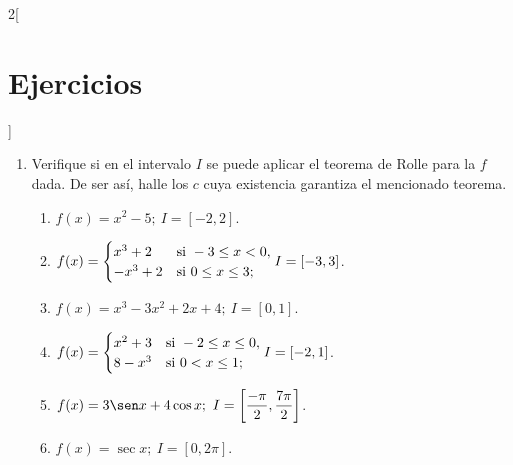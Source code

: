 \begin{multicols}{2}[\section{Ejercicios}]
\begingroup
\small
\begin{enumerate}[leftmargin=*]
\item Verifique si en el intervalo $I$ se puede aplicar el teorema de Rolle para la $f$ dada.
    De ser así, halle los $c$ cuya existencia garantiza el mencionado teorema.
    \begin{enumerate}[leftmargin=*]
    \item $\displaystyle f(x) = x^2 - 5;\ I = [-2,2]$.
    \item $\displaystyle f(x) =
          \begin{cases}
            x^3 + 2 & \text{si } -3 \leq x < 0, \\
            -x^3 + 2 & \text{si } 0 \leq x \leq 3;
          \end{cases}\\[6pt]
          I = [-3,3]$.
    \item $\displaystyle f(x) = x^3 - 3x^2 + 2x + 4;\ I = [0,1]$.
    \item $\displaystyle f(x) =
          \begin{cases}
            x^2 + 3 & \text{si } -2 \leq x \leq 0, \\
            8 - x^3 & \text{si } 0 < x \leq 1;
          \end{cases}\\[6pt]
          I = [-2,1]$.
    \item $\displaystyle f(x) = 3\sen x + 4\cos x;\ I =
        \left[\frac{-\pi}{2},\frac{7\pi}{2}\right]$.
    \item $\displaystyle f(x) = \sec x;\ I = [0,2\pi]$.
    \end{enumerate}


\end{enumerate}
\end{multicols}
